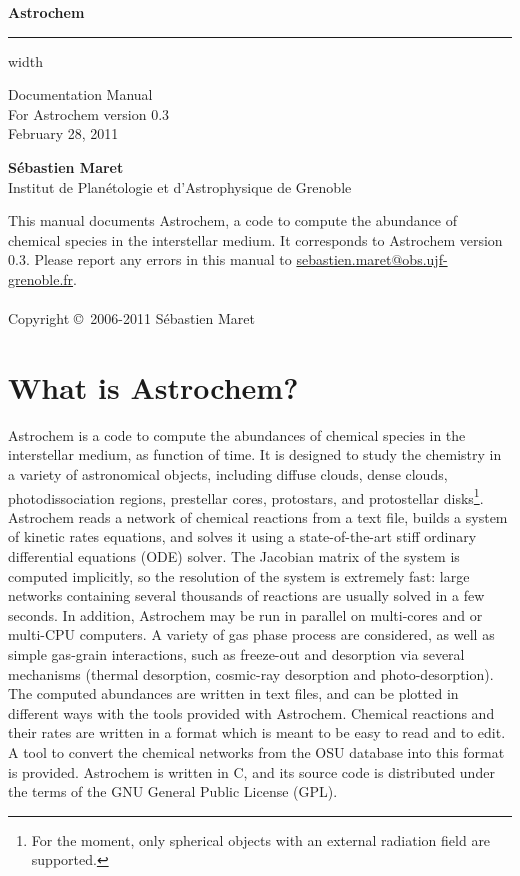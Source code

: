 \documentclass[a4paper,12pt]{article}
\makeatletter
\newcommand{\version}{0.3}
\newcommand{\updated}{February 28, 2011}
\newcommand{\bugreport}{\url{sebastien.maret@obs.ujf-grenoble.fr}}
\makeatother
\begin{document}
\VerbatimFootnotes

\thispagestyle{empty}
\vspace*{5cm}

\noindent
{\huge \textbf{Astrochem}}

\vskip4pt \hrule height 4pt width \hsize

\begin{flushright}
  \noindent
  { \small
    Documentation Manual\\
    For Astrochem version \version\\
    \updated
  }
\end{flushright}

\noindent
{\large \textbf{S\'ebastien Maret}}\\
{\small Institut de Plan\'etologie et d'Astrophysique de Grenoble\\}

\newpage
\vspace*{20cm}

{\small
  \noindent This manual documents Astrochem, a code to compute the
  abundance of chemical species in the interstellar medium. It
  corresponds to Astrochem version \version.
  Please report any errors in this manual to \bugreport.
  \\ \\ \noindent Copyright \copyright \, 2006-2011 S\'ebastien
  Maret
}

\section{What is Astrochem?}
\label{sec:what-astrochem}

Astrochem is a code to compute the abundances of chemical species in
the interstellar medium, as function of time. It is designed to study
the chemistry in a variety of astronomical objects, including diffuse
clouds, dense clouds, photodissociation regions, prestellar cores,
protostars, and protostellar disks\footnote{For the moment, only
  spherical objects with an external radiation field are
  supported.}. Astrochem reads a network of chemical reactions from a
text file, builds a system of kinetic rates equations, and solves it
using a state-of-the-art stiff ordinary differential equations (ODE)
solver. The Jacobian matrix of the system is computed implicitly, so
the resolution of the system is extremely fast: large networks
containing several thousands of reactions are usually solved in a few
seconds. In addition, Astrochem may be run in parallel on multi-cores
and or multi-CPU computers. A variety of gas phase process are
considered, as well as simple gas-grain interactions, such as
freeze-out and desorption via several mechanisms (thermal desorption,
cosmic-ray desorption and photo-desorption). The computed abundances
are written in text files, and can be plotted in different ways with
the tools provided with Astrochem. Chemical reactions and their rates
are written in a format which is meant to be easy to read and to
edit. A tool to convert the chemical networks from the OSU database
into this format is provided. Astrochem is written in C, and its
source code is distributed under the terms of the GNU General Public
License (GPL).
\end{document}
